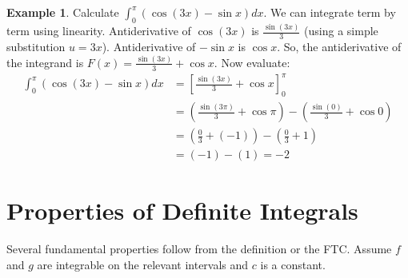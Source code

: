 \documentclass[11pt]{article}
\theoremstyle{definition}
\newtheorem{example}[theorem]{Example}
\theoremstyle{remark} %
\begin{document}
\begin{example}
Calculate $\int_0^\pi (\cos(3x) - \sin x) dx$.
We can integrate term by term using linearity.
Antiderivative of $\cos(3x)$ is $\frac{\sin(3x)}{3}$ (using a simple substitution $u=3x$).
Antiderivative of $-\sin x$ is $\cos x$.
So, the antiderivative of the integrand is $F(x) = \frac{\sin(3x)}{3} + \cos x$.
Now evaluate:
\begin{align*} \int_0^\pi (\cos(3x) - \sin x) dx &= \left[ \frac{\sin(3x)}{3} + \cos x \right]_0^\pi \\ &= \left( \frac{\sin(3\pi)}{3} + \cos \pi \right) - \left( \frac{\sin(0)}{3} + \cos 0 \right) \\ &= \left( \frac{0}{3} + (-1) \right) - \left( \frac{0}{3} + 1 \right) \\ &= (-1) - (1) = -2 \end{align*}
\end{example}

\section{Properties of Definite Integrals}

Several fundamental properties follow from the definition or the FTC. Assume $f$ and $g$ are integrable on the relevant intervals and $c$ is a constant.
\end{document}
